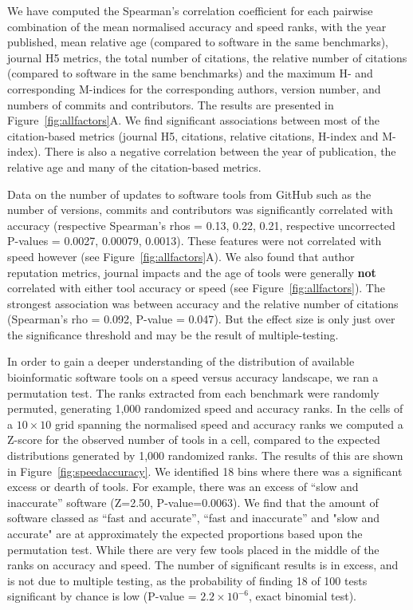 \documentclass[fleqn,10pt]{SelfArx} %
\begin{document}
We have computed the Spearman’s correlation coefficient for each
pairwise combination of the mean normalised accuracy and speed ranks,
with the year published, mean relative age (compared to software in the
same benchmarks), journal H5 metrics, the total number of citations,
the relative number of citations (compared to software in the same
benchmarks) and the maximum H- and corresponding M-indices for the corresponding
authors, version number, and numbers of commits and contributors.
The results are presented in Figure~\ref{fig:allfactors}A. We find
significant associations between most of the citation-based metrics
(journal H5, citations, relative citations, H-index and
M-index). There is also a negative correlation between the year of
publication, the relative age and many of the citation-based metrics.

Data on the
number of updates to software tools from GitHub such as the number of versions,
commits and contributors was significantly correlated with 
accuracy (respective Spearman’s rhos = {\color{black}0.13, 0.22, 0.21,} respective uncorrected P-values = {\color{black}0.0027, 0.00079, 0.0013}). 
These features were not correlated with speed however (see Figure~\ref{fig:allfactors}A).
We also found that author reputation metrics, journal impacts and the age
of tools were generally \textbf{not} correlated with either tool
accuracy or speed (see Figure~\ref{fig:allfactors}). The strongest
association was between accuracy and the relative
number of citations (Spearman’s rho = {\color{black}0.092,
P-value = 0.047}). But the effect size is only just over the
significance threshold and may be the result of multiple-testing. 


In order to gain a deeper understanding of the distribution of
available bioinformatic software tools on a speed versus accuracy
landscape, we ran a permutation test. The ranks extracted
from each benchmark were randomly permuted, generating 1,000
randomized speed and accuracy ranks. In the cells of a $10\times10$
grid spanning the normalised speed and accuracy ranks we computed a
Z-score for the observed number of tools in a cell, compared to the
expected distributions generated by 1,000 randomized ranks. The results
of this are shown in Figure~\ref{fig:speedaccuracy}. We identified {\color{black}18}
bins where there was a significant excess or dearth of tools. For
example, there was an excess of “slow and inaccurate” software ({\color{black}Z=2.50,
P-value=0.0063}). We find that the amount of software classed as “fast
and accurate”, “fast and inaccurate” and "slow and accurate" are at approximately the
expected proportions based upon the permutation test. 
While there are very few tools placed in the middle of the ranks on accuracy and speed.
The number of
significant results is in excess, and is not due to multiple testing, as
the probability of finding {\color{black}18} of 100 tests significant by chance is
low (P-value = {\color{black}$2.2\times 10^{-6}$}, exact binomial test).
\end{document}
